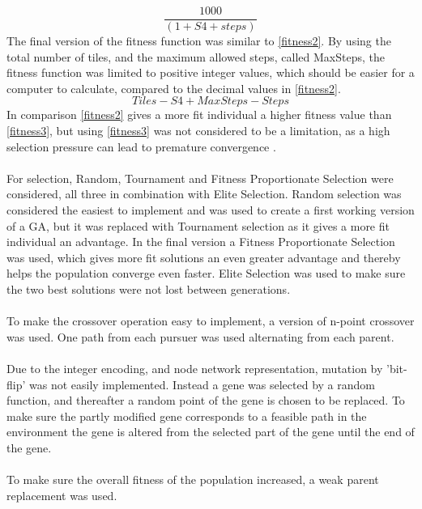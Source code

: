 %
\begin{equation}\label{fitness2} \frac{1000}{(1+S4+steps)} \end{equation}
%
The final version of the fitness function was similar to \eqref{fitness2}. By using the total number of tiles, and the maximum allowed steps, called MaxSteps, the fitness function was limited to positive integer values, which should be easier for a computer to calculate, compared to the decimal values in \eqref{fitness2}.
%
\begin{equation} \label{fitness3}Tiles-S4+MaxSteps-Steps \end{equation}
%
In comparison \eqref{fitness2} gives a more fit individual a higher fitness value than \eqref{fitness3}, but using \eqref{fitness3} was not considered to be a limitation, as a high selection pressure can lead to premature convergence \cite{GAHandbook1}.\\\\ %
For selection, Random, Tournament  and Fitness Proportionate Selection were considered, all three in combination with Elite Selection. Random selection was considered the easiest to implement and was used to create a first working version of a GA, but it was replaced with Tournament selection as it gives a more fit individual an advantage. In the final version a Fitness Proportionate Selection was used, which gives more fit solutions an even greater advantage and thereby helps the population converge even faster. Elite Selection was used to make sure the two best solutions were not lost between generations.\\\\
To make the crossover operation easy to implement, a version of n-point crossover was used. One path from each pursuer was used alternating from each parent.\\\\
Due to the integer encoding, and node network representation, mutation by 'bit-flip' was not easily implemented. Instead a gene was selected by a random function, and thereafter a random point of the gene is chosen to be replaced. To make sure the partly modified gene corresponds to a feasible path in the environment the gene is altered from the selected part of the gene until the end of the gene.\\\\
To make sure the overall fitness of the population increased, a weak parent replacement was used.\\\\
